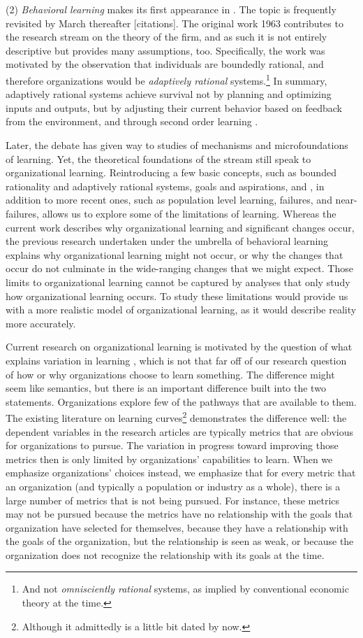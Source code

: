 \documentclass[12pt, man, natbib]{apa6}
\begin{document}
	(2) \textit{Behavioral learning} makes its first appearance in \citet{March1963}. The topic is frequently revisited by March thereafter [citations]. The original work 1963 contributes to the research stream on the theory of the firm, and as such it is not entirely descriptive but provides many assumptions, too. Specifically, the work was motivated by the observation that individuals are boundedly rational, and therefore organizations would be \textit{adaptively rational} systems.\footnote{And not \textit{omnisciently rational} systems, as implied by conventional economic theory at the time.} In summary, adaptively rational systems achieve survival not by planning and optimizing inputs and outputs, but by adjusting their current behavior based on feedback from the environment, and through second order learning \citep{Argyris1978}.
	
	Later, the debate has given way to studies of mechanisms and microfoundations of learning. Yet, the theoretical foundations of the stream still speak to organizational learning. Reintroducing a few basic concepts, such as bounded rationality and adaptively rational systems, goals and aspirations, and , in addition to more recent ones, such as population level learning, failures, and near-failures, allows us to explore some of the limitations of learning. Whereas the current work describes why organizational learning and significant changes occur, the previous research undertaken under the umbrella of behavioral learning explains why organizational learning might not occur, or why the changes that occur do not culminate in the wide-ranging changes that we might expect. Those limits to organizational learning cannot be captured by analyses that only study how organizational learning occurs. To study these limitations would provide us with a more realistic model of organizational learning, as it would describe reality more accurately. 
	
	Current research on organizational learning is motivated by the question of what explains variation in learning \citep[p. 2]{Argote2013a}, which is not that far off of our research question of how or why organizations choose to learn something. The difference might seem like semantics, but there is an important difference built into the two statements. Organizations explore few of the pathways that are available to them. The existing literature on learning curves\footnote{Although it admittedly is a little bit dated by now.} demonstrates the difference well: the dependent variables in the research articles are typically metrics that are obvious for organizations to pursue. The variation in progress toward improving those metrics then is only limited by organizations' capabilities to learn. When we emphasize organizations' choices instead, we emphasize that for every metric that an organization (and typically a population or industry as a whole), there is a large number of metrics that is not being pursued. For instance, these metrics may not be pursued because the metrics have no relationship with the goals that organization have selected for themselves, because they have a relationship with the goals of the organization, but the relationship is seen as weak, or because the organization does not recognize the relationship with its goals at the time.
	
\end{document}
